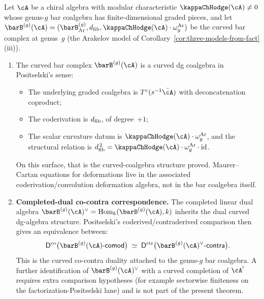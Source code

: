 \begin{theorem}
\label{thm:curved-koszul-genus-g}

Let $\cA$ be a chiral algebra with modular characteristic
$\kappaChHodge(\cA) \neq 0$ whose genus-$g$ bar coalgebra has
finite-dimensional graded pieces, and let
$\barB^{(g)}(\cA) = (\barB^{(g)}_{\mathrm{Ar}}, \dfib,
\kappaChHodge(\cA) \cdot \omega_g^{\mathrm{Ar}})$ be the curved bar complex at genus~$g$
\textup{(}the Arakelov model of
Corollary~\textup{\ref{cor:three-models-from-fact}(iii))}.

\begin{enumerate}[label=\textup{(\roman*)}]
\item The curved bar complex $\barB^{(g)}(\cA)$ is a curved dg
 coalgebra in Positselski's sense:
 \begin{itemize}
 \item The underlying graded coalgebra is
 $T^c(s^{-1}\bar\cA)$ with deconcatenation coproduct;
 \item The coderivation is $d_{\mathrm{fib}}$, of degree~$+1$;
 \item The scalar curvature datum is
 $\kappaChHodge(\cA) \cdot \omega_g^{\mathrm{Ar}}$, and the structural relation is
 $\dfib^{\,2} = \kappaChHodge(\cA) \cdot \omega_g^{\mathrm{Ar}} \cdot \id$.
 \end{itemize}
 On this surface, that is the curved-coalgebra structure
 proved. Maurer--Cartan equations for deformations live in the
 associated coderivation/convolution deformation algebra, not in
 the bar coalgebra itself.

\item \textbf{Completed-dual co-contra correspondence.}
 The completed linear dual algebra
 $\barB^{(g)}(\cA)^\vee = \operatorname{Hom}_k(\barB^{(g)}(\cA), k)$
 inherits the dual curved dg-algebra structure. Positselski's
 coderived/contraderived comparison then gives an equivalence
 between:
 \begin{equation}\label{eq:curved-koszul-equivalence}
 \Dco\bigl(\barB^{(g)}(\cA)\text{-}\mathsf{comod}\bigr)
 \;\simeq\;
 \Dctr\bigl(\barB^{(g)}(\cA)^\vee\text{-}\mathsf{contra}\bigr).
 \end{equation}
 This is the curved co-contra duality attached to the genus-$g$
 bar coalgebra. A further identification of
 $\barB^{(g)}(\cA)^\vee$ with a curved completion of $\cA^!$
 requires extra comparison hypotheses
 \textup{(}for example sectorwise finiteness on the
 factorization-Positselski lane\textup{)} and is not part of the
 present theorem.


\end{enumerate}
\end{theorem}
